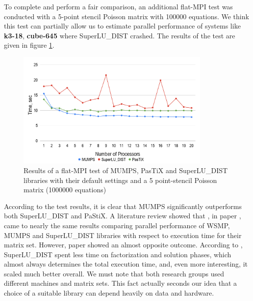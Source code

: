 

To complete and perform a fair comparison, an additional flat-MPI test was conducted with a 5-point stencil Poisson matrix with 100000 equations. We think this test can partially allow us to estimate parallel performance of systems like \textbf{k3-18}, \textbf{cube-645} where SuperLU\_DIST crashed. The results of the test are given in figure \ref{fig:5-point-stencil-solvers-comparison}.\\

\figpointer{\ref{fig:5-point-stencil-solvers-comparison}}
\begin{figure}[htpb]
  \centering
  \includegraphics[width=0.85\textwidth]{figures/chapter-2/solvers-comparison-5-point-stencil.png}
\caption{Results of a flat-MPI test of MUMPS, PasTiX and SuperLU\_DIST libraries with their default settings and a 5 point-stencil Poisson matrix (1000000  equations)}
\label{fig:5-point-stencil-solvers-comparison}
\end{figure}



According to the test results, it is clear that MUMPS significantly outperforms both SuperLU\_DIST and PaStiX. A literature review showed that \citeauthor{wsmp}, in paper \cite{wsmp}, came to nearly the same results comparing parallel performance of WSMP, MUMPS and SuperLU\_DIST libraries with respect to execution time for their matrix set. However, paper \cite{mm-comparison-of-packages} showed an almost opposite outcome. According to \citeauthor{mm-comparison-of-packages}, SuperLU\_DIST spent less time on factorization and solution phases, which almost always determines the total execution time, and, even more interesting, it scaled much better overall. We must note that both research groups used different machines and matrix sets. This fact actually seconds our idea that a choice of a suitable library can depend heavily on data and hardware.\\


